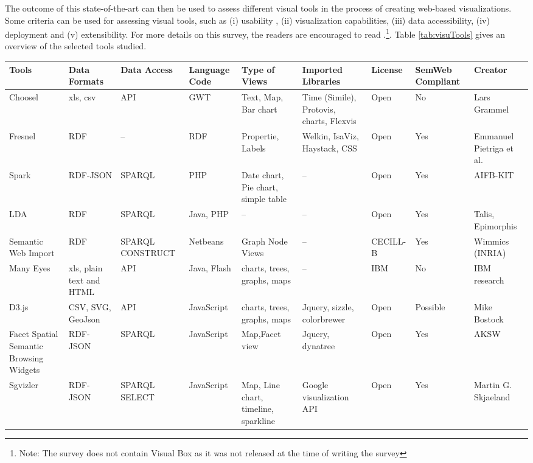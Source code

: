 The outcome of this state-of-the-art can then be used to assess different visual tools in the process of creating web-based visualizations. Some criteria can be used for assessing visual tools, such as (i) usability , (ii) visualization capabilities, (iii) data accessibility, (iv) deployment and (v) extensibility. For more details on this survey, the readers are encouraged to read \cite{deliverable2012b}.\footnote{Note: The survey does not contain Visual Box as it was not released at the time of writing the survey}. Table \ref{tab:visuTools} gives an overview of the selected tools studied.

\begin{landscape}
\begin{table}[htb]
\centering
\begin{tabularx}{\linewidth}{ |X|X|X|X|X|X|X|X|X|}
\hline
\textbf{Tools} & \textbf{Data Formats}& \textbf{Data Access} & \textbf{Language Code} & \textbf{Type of Views} & \textbf{Imported Libraries} & \textbf{License} & \textbf{SemWeb Compliant} & \textbf{Creator} \\
\hline
Choosel & xls, csv & API & GWT & Text, Map, Bar chart & Time (Simile), Protovis, charts, Flexvis & Open & No & Lars Grammel\\
\hline
Fresnel & RDF & --& RDF& Propertie,  Labels & Welkin, IsaViz, Haystack, CSS &  Open & Yes & Emmanuel Pietriga et al. \\
\hline
Spark & RDF-JSON & SPARQL& PHP& Date chart, Pie chart, simple table &  -- &  Open & Yes & AIFB-KIT \\
\hline
LDA & RDF & SPARQL& Java, PHP& -- &  -- &  Open & Yes & Talis, Epimorphis \\
\hline
Semantic Web Import & RDF & SPARQL CONSTRUCT& Netbeans& Graph Node Views &  -- &  CECILL-B & Yes & Wimmics (INRIA) \\
\hline
Many Eyes & xls, plain text and HTML & API& Java, Flash& charts, trees, graphs, maps & --&  IBM & No & IBM research \\
\hline
D3.js & CSV, SVG, GeoJson & API& JavaScript& charts, trees, graphs, maps & Jquery, sizzle, colorbrewer& Open & Possible & Mike Bostock \\
\hline
Facet Spatial Semantic Browsing Widgets & RDF- JSON & SPARQL& JavaScript& Map,Facet view & Jquery, dynatree&  Open & Yes & AKSW \\
\hline
Sgvizler & RDF- JSON & SPARQL SELECT& JavaScript& Map, Line chart, timeline, sparkline & Google visualization API&  Open & Yes & Martin G. Skjaeland \\

\end{tabularx}
\end{table}
\end{landscape}
